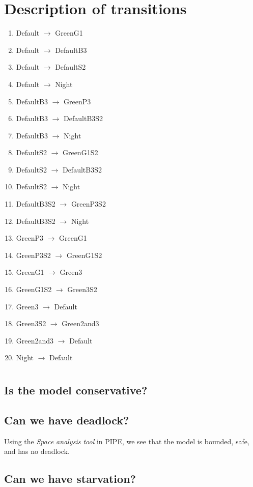 \documentclass[letterpaper,12pt]{article}
\begin{document}
\section{Description of transitions}
\begin{enumerate}
 \item Default $\rightarrow$ GreenG1
 \item Default $\rightarrow$ DefaultB3
 \item Default $\rightarrow$ DefaultS2
 \item Default $\rightarrow$ Night
 \item DefaultB3 $\rightarrow$ GreenP3
 \item DefaultB3 $\rightarrow$ DefaultB3S2
 \item DefaultB3 $\rightarrow$ Night
 \item DefaultS2 $\rightarrow$ GreenG1S2
 \item DefaultS2 $\rightarrow$ DefaultB3S2
 \item DefaultS2 $\rightarrow$ Night
 \item DefaultB3S2 $\rightarrow$ GreenP3S2
 \item DefaultB3S2 $\rightarrow$ Night
 \item GreenP3 $\rightarrow$ GreenG1
 \item GreenP3S2 $\rightarrow$ GreenG1S2
 \item GreenG1 $\rightarrow$ Green3
 \item GreenG1S2 $\rightarrow$ Green3S2
 \item Green3 $\rightarrow$ Default
 \item Green3S2 $\rightarrow$ Green2and3
 \item Green2and3 $\rightarrow$ Default
 \item Night $\rightarrow$ Default

\end{enumerate}
\section{}

\subsection{Is the model conservative?}

\subsection{Can we have deadlock?}
Using the \textit{Space analysis tool} in PIPE, we see that the model is bounded, safe, and has no deadlock.

\subsection{Can we have starvation?}
\end{document}
